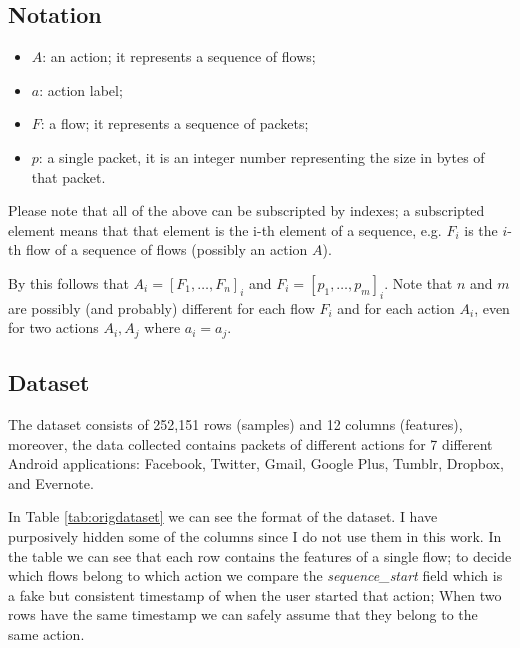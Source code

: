 \subsection{Notation}
\label{subsec:notation}
\begin{itemize}
 \item $ A $: an action; it represents a sequence of flows;
 \item $ a $: action label;
 \item $ F $: a flow; it represents a sequence of packets;
 \item $ p $: a single packet, it is an integer number representing the size in bytes of that packet.
\end{itemize}

Please note that all of the above can be subscripted by indexes; a subscripted element means that that element is the i-th element of a sequence, e.g. $F_i$ is the $i$-th flow of a sequence of flows (possibly an action $A$).
 
By this follows that $A_i = [F_1, \dots, F_n]_i$ and $F_i = [p_1,\dots, p_m]_i$. Note that $n$ and $m$ are possibly (and probably) different for each flow $F_i$ and for each action $A_i$, even for two actions $A_i, A_j$ where $a_i = a_j$.

\subsection{Dataset}
The dataset consists of 252,151 rows (samples) and 12 columns (features), moreover, the data collected contains packets of different actions for 7 different Android applications: Facebook, Twitter, Gmail, Google Plus, Tumblr, Dropbox, and Evernote. 

In Table \ref{tab:origdataset} we can see the format of the dataset. I have purposively hidden some of the columns since I do not use them in this work. In the table we can see that each row contains the features of a single flow; to decide which flows belong to which action we compare the \textit{sequence\_start} field which is a fake but consistent timestamp of when the user started that action; When two rows have the same timestamp we can safely assume that they belong to the same action.


